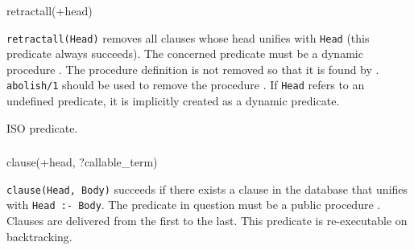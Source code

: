 \subsubsection{}

\begin{TemplatesOneCol}
retractall(+head)

\end{TemplatesOneCol}

\Description

\texttt{retractall(Head)} removes all clauses whose head unifies with
\texttt{Head} (this predicate always succeeds). The concerned predicate must
be a dynamic procedure . The
procedure definition is not removed so that it is found by
 . \texttt{abolish/1}
should be used to remove the procedure . If \texttt{Head}
refers to an undefined predicate, it is implicitly created as a dynamic
predicate.

\begin{PlErrors}




\end{PlErrors}

\Portability

ISO predicate.

\subsubsection{}

\begin{TemplatesOneCol}
clause(+head, ?callable\_term)

\end{TemplatesOneCol}

\Description

\texttt{clause(Head, Body)} succeeds if there exists a clause in the
database that unifies with \texttt{Head :- Body}. The predicate in question
must be a public procedure . Clauses are delivered from the first to the last. This
predicate is re-executable on backtracking.

